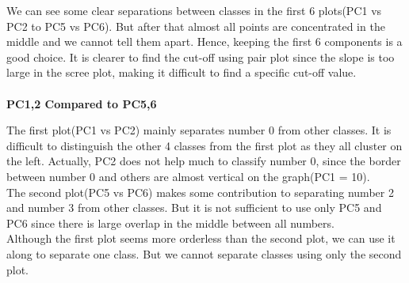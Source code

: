 \documentclass[12pt]{article}
\begin{document}
\noindent
We can see some clear separations between classes in the first 6 plots(PC1 vs PC2 to PC5 vs PC6). But after that almost all points are concentrated in the middle and we cannot tell them apart. Hence, keeping the first 6 components is a good choice. It is clearer to find the cut-off using pair plot since the slope is too large in the scree plot, making it difficult to find a specific cut-off value.\\\\
\textbf{PC1,2 Compared to PC5,6}
\begin{figure}[H]
\captionsetup[subfigure]{labelformat=empty}
\centering
{}
\end{figure}
\vspace*{-1.5cm}
\noindent
The first plot(PC1 vs PC2) mainly separates number 0 from other classes. It is difficult to distinguish the other 4 classes from the first plot as they all cluster on the left. Actually, PC2 does not help much to classify number 0, since the border between number 0 and others are almost vertical on the graph(PC1 = 10).\\
The second plot(PC5 vs PC6) makes some contribution to separating number 2 and number 3 from other classes. But it is not sufficient to use only PC5 and PC6 since there is large overlap in the middle between all numbers.\\
Although the first plot seems more orderless than the second plot, we can use it along to separate one class. But we cannot separate classes using only the second plot.\\\\
\end{document}
